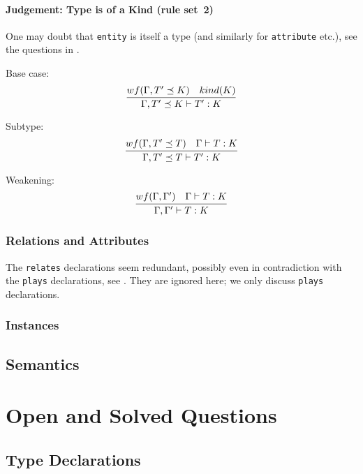 \documentclass{article}
\begin{document}
\paragraph{Judgement: Type is of a Kind (rule set~2)}

One may doubt that \texttt{entity} is itself a type (and similarly for
\texttt{attribute} etc.), see the questions in
.

Base case:
$$
\infer{\Gamma, T' \preceq K \vdash T' : K}{
  wf(\Gamma, T' \preceq K)  & kind(K)
}
$$

Subtype:
$$
\infer{\Gamma, T' \preceq T \vdash T' : K}{
  wf(\Gamma, T' \preceq T) & \Gamma \vdash T : K 
}
$$

Weakening:
$$
\infer{\Gamma, \Gamma' \vdash T : K}{
  wf(\Gamma, \Gamma')
  & 
  \Gamma \vdash T : K
}
$$


\subsubsection{Relations and Attributes}\label{sec:structure_rels_attribs}

The \texttt{relates} declarations seem redundant, possibly even in
contradiction with the \texttt{plays} declarations, see
. They are ignored here; we only discuss
\texttt{plays} declarations.



\subsubsection{Instances}\label{sec:structure_instances}




\subsection{Semantics}





\section{Open and Solved Questions}\label{sec:questions}

\subsection{Type Declarations}\label{sec:questions_type_decls}
\end{document}
